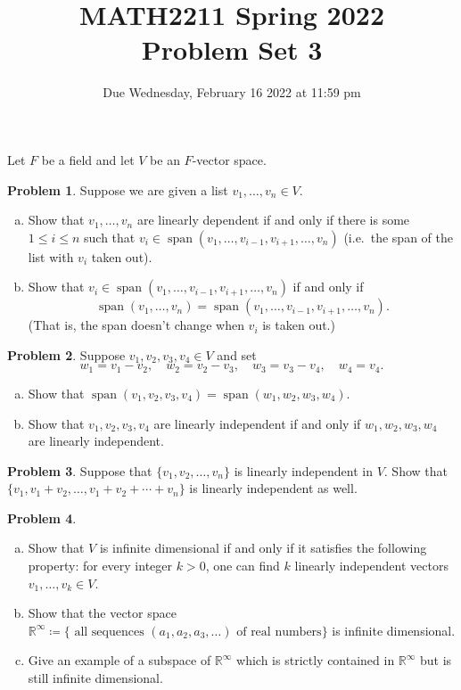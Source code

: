 \documentclass[11pt,oneside]{amsart}
\title{MATH2211 Spring 2022\\
Problem Set 3}
\author{Due Wednesday, February 16 2022 at 11:59 pm}
\theoremstyle{definition}
\newtheorem{problem}{Problem}
\newcommand{\bR}{\mathbb{R}}
\DeclareMathOperator{\Span}{span}
\begin{document}
    \maketitle

    Let $F$ be a field and let $V$ be an $F$-vector space.

    \begin{problem}
        Suppose we are given a list $v_1,\dots,v_n\in V$.
        \begin{enumerate}[(a)]
            \item Show that $v_1,\dots,v_n$ are linearly dependent if and only if there is some $1\leq i\leq n$ such that $v_i\in\Span(v_1,\dots,v_{i-1},v_{i+1},\dots,v_n)$ (i.e.\ the span of the list with $v_i$ taken out).
            \item Show that $v_i\in\Span(v_1,\dots,v_{i-1},v_{i+1},\dots,v_n)$ if and only if
            \[\Span(v_1,\dots,v_n)=\Span(v_1,\dots,v_{i-1},v_{i+1},\dots,v_n).\]
            (That is, the span doesn't change when $v_i$ is taken out.)
        \end{enumerate}
    \end{problem}
    
    \begin{problem}
        Suppose $v_1,v_2,v_3,v_4\in V$ and set
        \[w_1=v_1-v_2,\quad w_2=v_2-v_3,\quad w_3=v_3-v_4,\quad w_4=v_4.\]
        \begin{enumerate}[(a)]
            \item Show that $\Span(v_1,v_2,v_3,v_4)=\Span(w_1,w_2,w_3,w_4)$.
            \item Show that $v_1,v_2,v_3,v_4$ are linearly independent if and only if $w_1,w_2,w_3,w_4$ are linearly independent.
        \end{enumerate}
    \end{problem}

    \begin{problem}
        Suppose that $\{v_1,v_2,\dots,v_n\}$ is linearly independent in $V$. Show that $\{v_1,v_1+v_2,\dots,v_1+v_2+\cdots+v_n\}$ is linearly independent as well.
    \end{problem}

    \begin{problem}
        \leavevmode\begin{enumerate}[(a)]
            \item Show that $V$ is infinite dimensional if and only if it satisfies the following property: for every integer $k>0$, one can find $k$ linearly independent vectors $v_1,\dots,v_k\in V$.
            \item Show that the vector space $\bR^\infty\coloneqq\{\text{ all sequences }(a_1,a_2,a_3,\dots)\text{ of real numbers}\}$ is infinite dimensional.
            \item Give an example of a subspace of $\bR^\infty$ which is strictly contained in $\bR^\infty$ but is still infinite dimensional.
        \end{enumerate}
    \end{problem}
\end{document}
